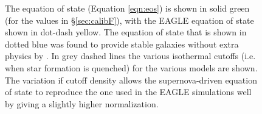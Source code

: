 \begin{figure}
    \leavevmode\rlap{\usebox{\graphicsbox}}
    \begin{minipage}[b]{0.42\wd\graphicsbox}
        {\caption{The equation of state (Equation \ref{eqn:eos}) is shown in solid green (for the values in \S \ref{sec:calibF}), with the EAGLE equation of state shown in dot-dash yellow. The equation of state that is shown in dotted blue was found to provide stable galaxies without extra physics by \citep{springel_cosmological_2003}. In grey dashed lines the various isothermal cutoffs (i.e. when star formation is quenched) for the various models are shown. The variation if cutoff density allows the supernova-driven equation of state to reproduce the one used in the EAGLE simulations well by giving a slightly higher normalization.}\label{fig:eos}}
\end{minipage}\hspace*{1\wd\graphicsbox}
\end{figure}


